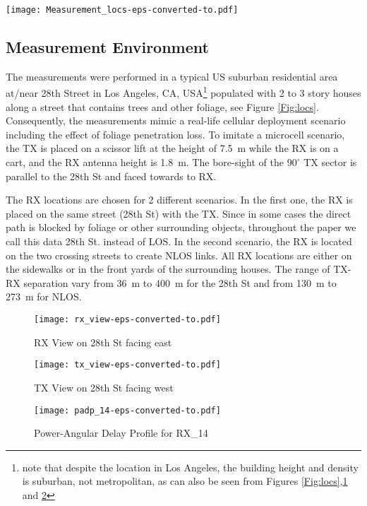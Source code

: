 \documentclass[conference]{IEEEtran}
\begin{document}
 
\begin{figure*}[tbp]\centering
  \texttt{[image: Measurement\_locs-eps-converted-to.pdf]}\caption{Measurement locations}\label{Fig:locs}
\end{figure*}

\subsection{Measurement Environment}
The measurements were performed in a typical US suburban residential area at/near 28th Street in Los Angeles, CA, USA\footnote{note that despite the location in Los Angeles, the building height and density is suburban, not metropolitan, as can also be seen from Figures \ref{Fig:locs},\ref{Fig:rx_view} and \ref{Fig:tx_view}} populated with 2 to 3 story houses along a street that contains trees and other foliage, see Figure \ref{Fig:locs}. Consequently, the measurements mimic a real-life cellular deployment scenario including the effect of foliage penetration loss. To imitate a microcell scenario, the TX is placed on a scissor lift at the height of \SI{7.5}{m} while the RX is on a cart, and the RX antenna height is \SI{1.8}{m}. The bore-sight of the $90^{\circ}$ TX sector is parallel to the 28th St and faced towards to RX.

The RX locations are chosen for 2 different scenarios. In the first one, the RX is placed on the same street (28th St) with the TX. Since in some cases the direct path is blocked by foliage or other surrounding objects, throughout the paper we call this data 28th St. instead of LOS. In the second scenario, the RX is located on the two crossing streets to create NLOS links. All RX locations are either on the sidewalks or in the front yards of the surrounding houses. The range of TX-RX separation vary from \SI{36}{m} to \SI{400}{m} for the 28th St and from \SI{130}{m} to \SI{273}{m} for NLOS.

\begin{figure}[tbp]\centering
  \texttt{[image: rx\_view-eps-converted-to.pdf]}\caption{RX View on 28th St facing east}\label{Fig:rx_view}
\end{figure}
\begin{figure}[tbp]\centering
  \texttt{[image: tx\_view-eps-converted-to.pdf]}\caption{TX View on 28th St facing west}\label{Fig:tx_view}
\end{figure}



\begin{figure}[tbp]\centering
  \texttt{[image: padp\_14-eps-converted-to.pdf]}\caption{Power-Angular Delay Profile for RX\_14}\label{Fig:padp}
\end{figure}
\end{document}
